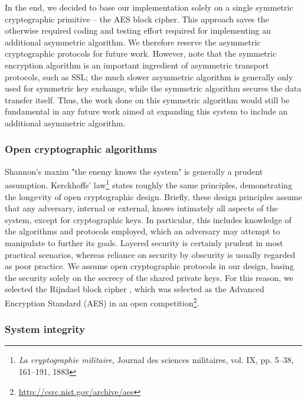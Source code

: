 In the end, we decided to base our implementation solely on a single symmetric cryptographic primitive -- the AES block cipher. This approach saves the otherwise required coding and testing effort required for implementing an additional asymmetric algorithm. We therefore reserve the asymmetric cryptographic protocols for future work. However, note that the symmetric encryption algorithm is an important ingredient of asymmetric transport protocols, such as SSL; the much slower asymmetric algorithm is generally only used for symmetric key exchange, while the symmetric algorithm secures the data transfer itself. Thus, the work done on this symmetric algorithm would still be fundamental in any future work aimed at expanding this system to include an additional asymmetric algorithm.

\subsubsection{Open cryptographic algorithms}

Shannon's maxim "the enemy knows the system" is generally a prudent assumption. Kerckhoffs' law\footnote{\textit{La cryptographie militaire}, Journal des sciences militaires, vol. IX, pp. 5--38, 161–191, 1883} states roughly the same principles, demonstrating the longevity of open cryptographic design. Briefly, these design principles assume that any adversary, internal or external, knows intimately all aspects of the system, except for cryptographic keys. In particular, this includes knowledge of the algorithms and protocols employed, which an adversary may attempt to manipulate to further its goals. Layered security is certainly prudent in most practical scenarios, whereas reliance on security by obscurity is usually regarded as poor practice. We assume open cryptographic protocols in our design, basing the security solely on the secrecy of the shared private keys. For this reason, we selected the Rijndael block cipher , which was selected as the Advanced Encryption Standard (AES) in an open competition\footnote{\url{http://csrc.nist.gov/archive/aes}}.

\subsubsection{System integrity}

